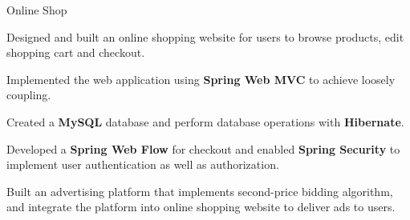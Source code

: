\begin{cvprojects}
    
    
    \cvproject
    {Online Shop}
    {}
    {}
    {
      \begin{cvitems}
        \item {Designed and built an online shopping website for users to browse products, edit shopping cart and checkout.}
        \item {Implemented the web application using \textbf{Spring Web MVC} to achieve loosely coupling. }
        \item {Created a \textbf{MySQL} database and perform database operations with \textbf{Hibernate}.}
        \item {Developed a \textbf{Spring Web Flow} for checkout and enabled \textbf{Spring Security} to implement user authentication as well as authorization.}
        \item {Built an advertising platform that implements second-price bidding algorithm, and integrate the platform into online shopping website to deliver ads to users.}
      \end{cvitems}
    }
    
    
    

    

    
 
\end{cvprojects}
